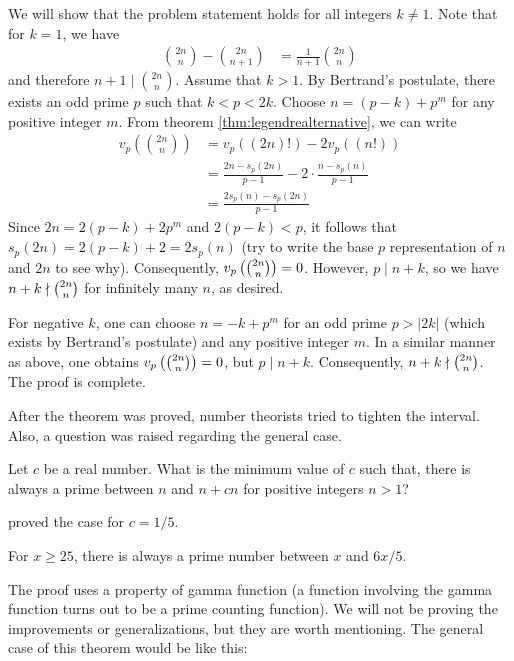\documentclass{subfile}
\begin{document}
	\begin{solution}
		We will show that the problem statement holds for all integers $k \neq 1$. Note that for $k=1$, we have
			\begin{align*}
				\binom{2n}{n} - \binom{2n}{n+1}
					& = \frac{1}{n+1}\binom{2n}{n}
			\end{align*}
		and therefore $n+1\mid \binom{2n}{n}$. Assume that $k>1$. By Bertrand's postulate, there exists an odd prime $p$ such that $k<p<2k$. Choose $n=(p-k)+p^m$ for any positive integer $m$. From theorem \autoref{thm:legendrealternative}, we can write
			\begin{align*}
				v_p \left(\binom{2n}n\right)  &=  v_p((2n)!) - 2v_p((n!))\\
				&=  \frac{2n - s_p(2n)}{p-1} - 2 \cdot \frac{n - s_p(n)}{p-1}\\
				&=   \frac{2s_p(n) - s_p(2n)}{p - 1}
			\end{align*}
		Since $2n = 2(p - k) + 2p^m$ and $2(p - k) < p$, it follows that $s_p(2n) = 2(p - k) + 2 = 2s_p(n)$ (try to write the base $p$ representation of $n$ and $2n$ to see why). Consequently, $v_p\left(\tbinom{2n}{n}\right) = 0$. However, $p \mid n + k$, so we have $n + k \nmid \tbinom{2n}{n}$ for infinitely many $n$, as desired.

		For negative $k$, one can choose $n = -k + p^m$ for an odd prime $p > |2k|$ (which exists by Bertrand's postulate) and any positive integer $m$. In a similar manner as above, one obtains $v_p\left(\tbinom{2n}{n}\right) = 0$, but $p \mid n + k$. Consequently, $n + k \nmid \tbinom{2n}{n}$. The proof is complete.
	\end{solution}
After the theorem was proved, number theorists tried to tighten the interval. Also, a question was raised regarding the general case.
	\begin{problem}
		Let $c$ be a real number. What is the minimum value of $c$ such that, there is always a prime between $n$ and $n+cn$ for positive integers $n>1$?
	\end{problem}
\textcite{nagura_1952} proved the case for $c=1/5$.
	\begin{theorem}[Nagura]
		For $x\geq25$, there is always a prime number between $x$ and $6x/5$.
	\end{theorem}
The proof uses a property of gamma function (a function involving the gamma function turns out to be a prime counting function). We will not be proving the improvements or generalizations, but they are worth mentioning. The general case of this theorem would be like this:
\end{document}
